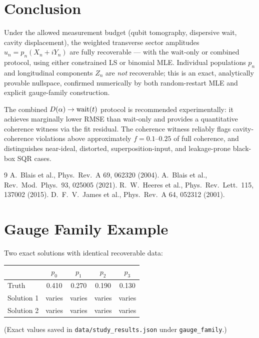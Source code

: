 \documentclass[11pt,onecolumn]{article}
\begin{document}
\section{Conclusion}

Under the allowed measurement budget (qubit tomography, dispersive wait, cavity
displacement), the weighted transverse sector amplitudes
$u_n=p_n(X_n+iY_n)$ are fully recoverable — with the wait-only or combined
protocol, using either constrained LS or binomial MLE.  Individual populations
$p_n$ and longitudinal components $Z_n$ are \emph{not} recoverable; this is an
exact, analytically provable nullspace, confirmed numerically by both random-restart
MLE and explicit gauge-family construction.

The combined $D(\alpha)\to{\rm wait}(t)$ protocol is recommended
experimentally: it achieves marginally lower RMSE than wait-only and provides a
quantitative coherence witness via the fit residual.  The coherence witness reliably
flags cavity-coherence violations above approximately $f=0.1$--$0.25$ of full
coherence, and distinguishes near-ideal, distorted, superposition-input, and
leakage-prone black-box SQR cases.

\begin{thebibliography}{9}
A.~Blais et al., Phys.\ Rev.\ A 69, 062320 (2004).
A.~Blais et al., Rev.\ Mod.\ Phys.\ 93, 025005 (2021).
R.~W.~Heeres et al., Phys.\ Rev.\ Lett.\ 115, 137002 (2015).
D.~F.~V.~James et al., Phys.\ Rev.\ A 64, 052312 (2001).
\end{thebibliography}

\appendix
\section{Gauge Family Example}
Two exact solutions with identical recoverable data:
\begin{center}
\begin{tabular}{lcccc}
\toprule
& $p_0$ & $p_1$ & $p_2$ & $p_3$\\
\midrule
Truth & 0.410 & 0.270 & 0.190 & 0.130\\
Solution 1 & varies & varies & varies & varies\\
Solution 2 & varies & varies & varies & varies\\
\bottomrule
\end{tabular}
\end{center}
(Exact values saved in \texttt{data/study\_results.json} under \texttt{gauge\_family}.)
\end{document}
